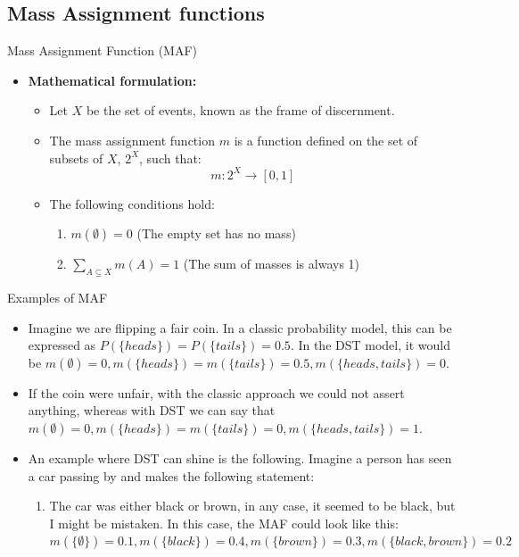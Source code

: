 \documentclass[aspectratio=169]{beamer}
\begin{document}
\subsection{Mass Assignment functions}
\begin{frame}{Mass Assignment Function (MAF)}
  \begin{itemize}
    \item \textbf{Mathematical formulation:}
      \begin{itemize}
        \item Let \( X \) be the set of events, known as the frame of discernment. \pause
        \item The mass assignment function \( m \) is a function defined on the set of subsets of \( X \), \( 2^X \), such that:
          \[
          m : 2^X \rightarrow [0, 1]
          \]
        \pause
        \item The following conditions hold:
          \begin{enumerate}
            \item \( m(\emptyset) = 0 \) (The empty set has no mass)
            \item \( \sum\limits_{A \subseteq X} m(A) = 1 \) (The sum of masses is always 1)
          \end{enumerate}
      \end{itemize}
  \end{itemize}
\end{frame}

\begin{frame}{Examples of MAF}
\begin{itemize}
    \item Imagine we are flipping a fair coin. In a classic probability model, this can be expressed as $P(\{heads\}) = P(\{tails\}) = 0.5$. In the DST model, it would be $m(\emptyset) = 0, m(\{heads\}) = m(\{tails\}) = 0.5, m(\{heads, tails\}) = 0$.
    \pause
    \item If the coin were unfair, with the classic approach we could not assert anything, whereas with DST we can say that $m(\emptyset) = 0, m(\{heads\}) = m(\{tails\}) = 0, m(\{heads, tails\}) = 1$.
    \pause
    \item An example where DST can shine is the following. Imagine a person has seen a car passing by and makes the following statement:
    \begin{enumerate}
        \item The car was either black or brown, in any case, it seemed to be black, but I might be mistaken.
        In this case, the MAF could look like this: $m(\{\emptyset\}) = 0.1, m(\{ black\}) = 0.4, m(\{ brown\}) = 0.3, m(\{ black, brown\}) = 0.2$
    \end{enumerate}
\end{itemize}
\end{frame}
\end{document}
